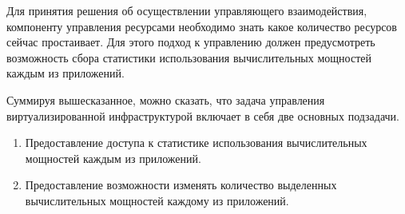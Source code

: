 Для принятия решения об осуществлении управляющего взаимодействия, компоненту управления ресурсами необходимо знать какое количество ресурсов сейчас простаивает\cite{fake-32}.
Для этого подход к управлению должен предусмотреть возможность сбора статистики использования вычислительных мощностей каждым из приложений\cite{fake-33}.

Суммируя вышесказанное, можно сказать, что задача управления виртуализированной инфраструктурой включает в себя две основных подзадачи.
\begin{enumerate}
    \item Предоставление доступа к статистике использования вычислительных мощностей каждым из приложений.
    \item Предоставление возможности изменять количество выделенных вычислительных мощностей каждому из приложений.
\end{enumerate}
